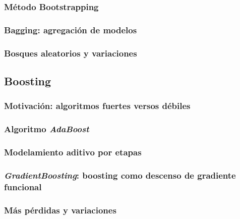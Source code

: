 \subsubsection{Método Bootstrapping}

\subsubsection{Bagging: agregación de modelos}

\subsubsection{Bosques aleatorios y variaciones}


\subsection{Boosting}
\label{sec:boosting}

\subsubsection{Motivación: algoritmos fuertes versos débiles}

\subsubsection{Algoritmo \textit{AdaBoost}}

\subsubsection{Modelamiento aditivo por etapas}

\subsubsection{\textit{GradientBoosting}: boosting como descenso de gradiente funcional}

\subsubsection{Más pérdidas y variaciones}
